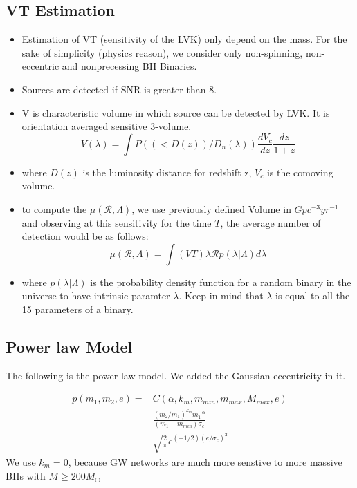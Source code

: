 \documentclass[twocolumn,prd,nofootinbib]{revtex4}
\begin{document}
\subsection{VT Estimation}
\begin{itemize}
    \item Estimation of VT (sensitivity of the LVK) only depend on the mass. For the sake of simplicity {\color{red}(physics reason)}, we consider only non-spinning, non-eccentric and nonprecessing BH Binaries. 
    \item Sources are detected if SNR is greater than 8.
    \item V is characteristic volume in which source can be detected by LVK. It is orientation averaged sensitive 3-volume.
\begin{equation}
\label{eq:volume}
V(\lambda) = \int P((<D(z))/D_n(\lambda))\frac{dV_c}{dz}\frac{dz}{1+z}
\end{equation}    
    \item where $D(z)$ is the luminosity distance for redshift z, $V_c$ is the comoving volume.

    \item to compute the $\mu(\mathcal{R},\Lambda)$, we use previously defined Volume in $Gpc^{-3}yr^{-1}$ and observing at this sensitivity for the time $T$, the average number of detection would be as follows: \\
\begin{equation}
\label{eq:mu}
  \mu(\mathcal{R},\Lambda) = \int(VT)\lambda \mathcal{R}p(\lambda|\Lambda)d\lambda  
\end{equation}
    \item where $p(\lambda|\Lambda)$ is the probability density function for a random binary in the universe to have intrinsic paramter $\lambda$. Keep in mind that $\lambda$ is equal to all the 15 parameters of a binary.
\end{itemize}

\subsection{Power law Model}
The following is the power law model. We added the Gaussian eccentricity in it. 

\begin{align}
\label{eq:plawg}
p(m_1,m_2,e) = &C(\alpha,k_m,m_{min},m_{max},M_{max},e)  
\nonumber \\ & \frac{(m_2/m_1)^{k_m}m_1^{-\alpha}}{(m_1-m_{min})\sigma_e} 
\nonumber \\ &
\sqrt{\frac{2}{\pi}} e^{(-1/2)(e/\sigma_e)^2}
\end{align}
We use $k_m=0$, because GW networks are much more senstive to more massive BHs with $M\geq 200 M_\odot$
\end{document}
